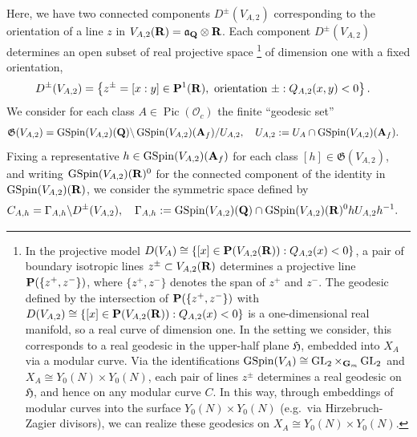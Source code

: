 \documentclass{amsart}
\theoremstyle{definition}
\begin{document}
Here, we have two connected components $D^{\pm}(V_{A, 2})$ corresponding to the orientation of a line $z$ in 
$V_{A, 2}({\bf{R}}) = \mathfrak{a}_{\bf{Q}} \otimes {\bf{R}} $. 
Each component $D^{\pm}(V_{A, 2})$ determines an open subset of 
real projective space \footnote{In the projective model $D(V_A) \cong \lbrace [x] \in {\bf{P}}(V_{A,2}({\bf{R}})) : Q_{A,2}(x) <0 \rbrace $, 
a pair of boundary isotropic lines $z^{\pm} \subset V_{A,2}({\bf{R}})$ determines a projective line ${\bf{P}}(\lbrace z^+, z^- \rbrace)$,
where $\lbrace z^+, z^- \rbrace$ denotes the span of $z^+$ and $z^-$. The geodesic defined by the intersection of 
${\bf{P}}(\lbrace z^+, z^- \rbrace)$ with $D(V_{A,2}) \cong \lbrace [x] \in {\bf{P}}(V_{A,2}({\bf{R}})) : Q_{A,2}(x) <0 \rbrace$
is a one-dimensional real manifold, so a real curve of dimension one. In the setting we consider, this corresponds to a real 
geodesic in the upper-half plane $\mathfrak{H}$, embedded into $X_A$ via a modular curve. 
Via the identifications $\operatorname{GSpin}(V_A) \cong  \operatorname{GL}_2 \times_{{\bf{G}}_m} \operatorname{GL}_2$ and 
$X_A \cong Y_0(N) \times Y_0(N)$, each pair of lines $z^{\pm} $ determines 
a real geodesic on $\mathfrak{H}$, and hence on any modular curve $C$. In this way,
through embeddings of modular curves into the surface $Y_0(N) \times Y_0(N)$ (e.g.~via Hirzebruch-Zagier divisors), 
we can realize these geodesics on $X_A \cong Y_0(N) \times Y_0(N)$.} of dimension one with a fixed orientation,
\begin{align*} D^{\pm}(V_{A, 2}) &= \left\lbrace z^{\pm} = [x:y] \in {\bf{P}}^1({\bf{R}}), ~\text{orientation $\pm$}: Q_{A, 2}(x, y) < 0 \right\rbrace. \end{align*}
We consider for each class $A \in \operatorname{Pic}(\mathcal{O}_c)$ the finite ``geodesic set''
\begin{align*} \mathfrak{G}(V_{A, 2}) &= \operatorname{GSpin}(V_{A, 2})({\bf{Q}}) \backslash
\operatorname{GSpin}(V_{A, 2})({\bf{A}}_f) / U_{A,2}, \quad U_{A,2} :=U_A \cap \operatorname{GSpin}(V_{A, 2})({\bf{A}}_f). \end{align*}
Fixing a representative $h \in \operatorname{GSpin}(V_{A,2})({\bf{A}}_f)$ for each class $[h] \in \mathfrak{G}(V_{A,2})$, 
and writing $\operatorname{GSpin}(V_{A, 2})({\bf{R}})^0$ for the connected component of the identity in $\operatorname{GSpin}(V_{A, 2})({\bf{R}})$, we consider the symmetric space defined by
\begin{align*} C_{A, h} &= \Gamma_{A, h} \backslash D^{\pm}(V_{A,2}), 
\quad \Gamma_{A, h} := \operatorname{GSpin}(V_{A,2})({\bf{Q}}) \cap \operatorname{GSpin}(V_{A, 2})({\bf{R}})^0 h U_{A,2} h^{-1}. \end{align*}
\end{document}
